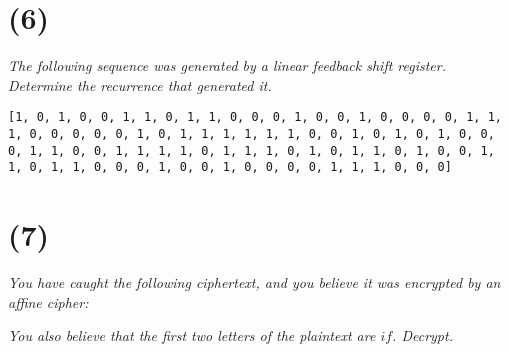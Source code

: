 \documentclass[12pt]{article}
\begin{document}
\section*{(6)} \textit{The following sequence was generated by a linear feedback shift register. Determine the recurrence that generated it.}

\texttt{[1, 0, 1, 0, 0, 1, 1, 0, 1, 1, 0, 0, 0, 1, 0, 0, 1, 0, 0, 0, 0, 1, 1,
1, 0, 0, 0, 0, 0, 1, 0, 1, 1, 1, 1, 1, 1, 0, 0, 1, 0, 1, 0, 1, 0, 0,
0, 1, 1, 0, 0, 1, 1, 1, 1, 0, 1, 1, 1, 0, 1, 0, 1, 1, 0, 1, 0, 0, 1,
1, 0, 1, 1, 0, 0, 0, 1, 0, 0, 1, 0, 0, 0, 0, 1, 1, 1, 0, 0, 0]}

\section*{(7)} \textit{You have caught the following ciphertext, and you believe it was encrypted by an affine cipher:}


\textit{You also believe that the first two letters of the plaintext are $if$. Decrypt.}
\end{document}
